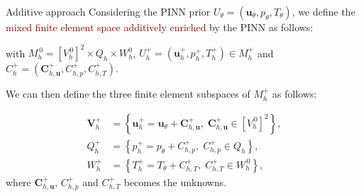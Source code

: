 \begin{frame}{Additive approach} %
    Considering the PINN prior $U_\theta = (\bm{u}_\theta, p_\theta, T_\theta)$, we define the \textcolor{darkred}{mixed finite element space additively enriched} by the PINN as follows:
    
    \begin{center}
    \end{center}

    with $M_h^{\, 0}=[V_h^{\, 0}]^2 \times Q_h \times W_h^0$,
    $U_h^+ = (\bm{u}_h^+, p_h^+, T_h^+) \in M_h^+$ and $C_h^+ = (\bm{C}_{h,\bm{u}}^+, C_{h,p}^+, C_{h,T}^+)$.

    \vspace{8pt}

    We can then define the three finite element subspaces of $M_h^+$ as follows:
    \begin{minipage}{0.6\linewidth}
        \vspace{-15pt}
        \begin{align*}
            \bm{V}_h^+ &= \left\{\bm{u}_h^+ = \bm{u}_\theta + \bm{C}_{h,\bm{u}}^+, \; \bm{C}_{h,\bm{u}}^+ \in [V_h^{\, 0}]^2\right\}, \\
            Q_h^+ &= \left\{p_h^+ = p_\theta + C_{h,p}^+, \; C_{h,p}^+ \in Q_h\right\}, \\
            W_h^+ &= \left\{T_h^+ = T_\theta + C_{h,T}^+, \; C_{h,T}^+ \in W_h^{\, 0}\right\},
        \end{align*}
        where $\bm{C}_{h,\bm{u}}^+$, $C_{h,p}^+$ and $C_{h,T}^+$ becomes the unknowns.
        
    \end{minipage}
    \begin{minipage}{0.38\linewidth}
        \centering
        \vspace{5pt}
    \end{minipage}
\end{frame}


